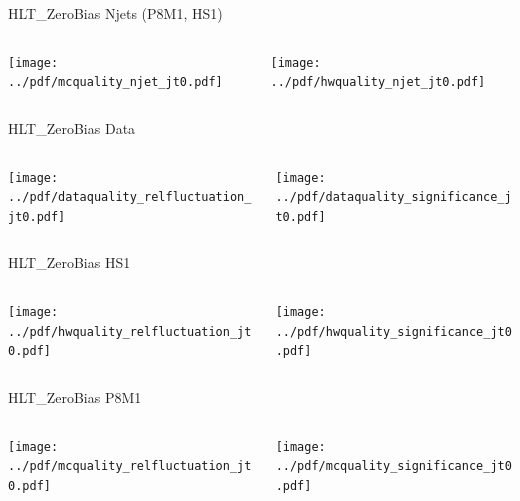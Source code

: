 \documentclass[9pt]{beamer}
\begin{document}
\begin{frame}[t]{HLT\_ZeroBias Njets (P8M1, HS1)}
\begin{columns}[T]
  \begin{column}{.5\textwidth}
  \texttt{[image: ../pdf/mcquality\_njet\_jt0.pdf]}
  \end{column}
  \begin{column}{.5\textwidth}
  \texttt{[image: ../pdf/hwquality\_njet\_jt0.pdf]}
  \end{column}
\end{columns}
\end{frame}

\begin{frame}[t]{HLT\_ZeroBias Data}
\begin{columns}[T]
  \begin{column}{.5\textwidth}
  \texttt{[image: ../pdf/dataquality\_relfluctuation\_jt0.pdf]}
  \end{column}
  \begin{column}{.5\textwidth}
  \texttt{[image: ../pdf/dataquality\_significance\_jt0.pdf]}
  \end{column}
\end{columns}
\end{frame}

\begin{frame}[t]{HLT\_ZeroBias HS1}
\begin{columns}[T]
  \begin{column}{.5\textwidth}
  \texttt{[image: ../pdf/hwquality\_relfluctuation\_jt0.pdf]}
  \end{column}
  \begin{column}{.5\textwidth}
  \texttt{[image: ../pdf/hwquality\_significance\_jt0.pdf]}
  \end{column}
\end{columns}
\end{frame}

\begin{frame}[t]{HLT\_ZeroBias P8M1}
\begin{columns}[T]
  \begin{column}{.5\textwidth}
  \texttt{[image: ../pdf/mcquality\_relfluctuation\_jt0.pdf]}
  \end{column}
  \begin{column}{.5\textwidth}
  \texttt{[image: ../pdf/mcquality\_significance\_jt0.pdf]}
  \end{column}
\end{columns}
\end{frame}
\end{document}
